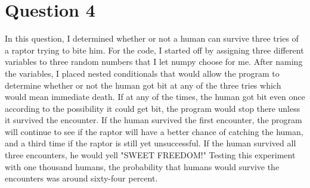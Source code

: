 \documentclass[twocolumn]{revtex4}
\begin{document}
\section{Question 4}

In this question, I determined whether or not a human can survive three tries of a raptor trying to bite him. For the code, I started off by assigning three different variables to three random numbers that I let numpy choose for me. After naming the variables, I placed nested conditionals that would allow the program to determine whether or not the human got bit at any of the three tries which would mean immediate death. If at any of the times, the human got bit even once according to the possibility it could get bit, the program would stop there unless it survived the encounter. If the human survived the first encounter,  the program will continue to see if the raptor will have a better chance of catching the human, and a third time if the raptor is still yet unsuccessful. If the human survived all three encounters, he would yell "SWEET FREEDOM!" Testing this experiment with one thousand humans, the probability that humans would survive the encounters was around sixty-four percent.  

\end{document}
